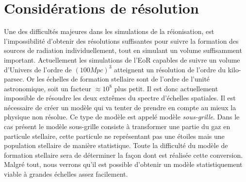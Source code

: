 \section{Considérations de résolution}

Une des difficultés majeures dans les simulations de la réionisation, est l'impossibilité d'obtenir des résolutions suffisantes pour suivre la formation des sources de radiation individuellement, tout en simulant un volume suffisamment important.
Actuellement les simulations de l'\ac{EoR} capables de suivre un volume d'Univers de l'ordre de $(100Mpc)^3$ atteignent un résolution de l'ordre du kilo-parsec.
Or les échelles de formation stellaire sont de l'ordre de l'unité astronomique, soit un facteur $\approx 10^8$ plus petit.
Il est donc actuellement impossible de résoudre les deux extrêmes du spectre d'échelles spatiales.
Il est nécessaire de créer un modèle qui va tenter de prendre en compte au mieux la physique non résolue.
Ce type de modèle est appelé modèle \textit{sous-grille}.
Dans le cas présent le modèle sous-grille consiste à transformer une partie du gaz en particule stellaire, cette particule ne représentant pas une étoiles mais une population stellaire de manière statistique.
Toute la difficulté du modèle de formation stellaire sera de déterminer la façon dont est réalisée cette conversion.
Malgré tout, nous verrons qu'il est possible d'obtenir un modèle statistiquement viable à grandes échelles assez facilement.



